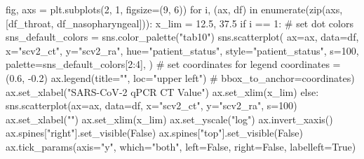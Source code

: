 \documentclass[
  letterpaper,
  DIV=11,
  numbers=noendperiod]{scrartcl}
\newenvironment{Shaded}{\begin{snugshade}}{\end{snugshade}}
\newcommand{\BuiltInTok}[1]{\textcolor[rgb]{0.00,0.23,0.31}{#1}}
\newcommand{\CommentTok}[1]{\textcolor[rgb]{0.37,0.37,0.37}{#1}}
\newcommand{\ControlFlowTok}[1]{\textcolor[rgb]{0.00,0.23,0.31}{#1}}
\newcommand{\DecValTok}[1]{\textcolor[rgb]{0.68,0.00,0.00}{#1}}
\newcommand{\FloatTok}[1]{\textcolor[rgb]{0.68,0.00,0.00}{#1}}
\newcommand{\KeywordTok}[1]{\textcolor[rgb]{0.00,0.23,0.31}{#1}}
\newcommand{\NormalTok}[1]{\textcolor[rgb]{0.00,0.23,0.31}{#1}}
\newcommand{\OperatorTok}[1]{\textcolor[rgb]{0.37,0.37,0.37}{#1}}
\newcommand{\StringTok}[1]{\textcolor[rgb]{0.13,0.47,0.30}{#1}}
\newcommand{\VariableTok}[1]{\textcolor[rgb]{0.07,0.07,0.07}{#1}}
\begin{document}
\begin{Shaded}
\begin{Highlighting}[]
\NormalTok{fig, axs }\OperatorTok{=}\NormalTok{ plt.subplots(}\DecValTok{2}\NormalTok{, }\DecValTok{1}\NormalTok{, figsize}\OperatorTok{=}\NormalTok{(}\DecValTok{9}\NormalTok{, }\DecValTok{6}\NormalTok{))}
\ControlFlowTok{for}\NormalTok{ i, (ax, df) }\KeywordTok{in} \BuiltInTok{enumerate}\NormalTok{(}\BuiltInTok{zip}\NormalTok{(axs, [df\_throat, df\_nasopharyngeal])):}
\NormalTok{    x\_lim }\OperatorTok{=} \FloatTok{12.5}\NormalTok{, }\FloatTok{37.5}
    \ControlFlowTok{if}\NormalTok{ i }\OperatorTok{==} \DecValTok{1}\NormalTok{:}
        \CommentTok{\# set dot colors}
\NormalTok{        sns\_default\_colors }\OperatorTok{=}\NormalTok{ sns.color\_palette(}\StringTok{"tab10"}\NormalTok{)}
\NormalTok{        sns.scatterplot(}
\NormalTok{            ax}\OperatorTok{=}\NormalTok{ax,}
\NormalTok{            data}\OperatorTok{=}\NormalTok{df,}
\NormalTok{            x}\OperatorTok{=}\StringTok{"scv2\_ct"}\NormalTok{,}
\NormalTok{            y}\OperatorTok{=}\StringTok{"scv2\_ra"}\NormalTok{,}
\NormalTok{            hue}\OperatorTok{=}\StringTok{"patient\_status"}\NormalTok{,}
\NormalTok{            style}\OperatorTok{=}\StringTok{"patient\_status"}\NormalTok{,}
\NormalTok{            s}\OperatorTok{=}\DecValTok{100}\NormalTok{,}
\NormalTok{            palette}\OperatorTok{=}\NormalTok{sns\_default\_colors[}\DecValTok{2}\NormalTok{:}\DecValTok{4}\NormalTok{],}
\NormalTok{        )}
        \CommentTok{\# set coordinates for legend}
\NormalTok{        coordinates }\OperatorTok{=}\NormalTok{ (}\FloatTok{0.6}\NormalTok{, }\OperatorTok{{-}}\FloatTok{0.2}\NormalTok{)}
\NormalTok{        ax.legend(title}\OperatorTok{=}\StringTok{""}\NormalTok{, loc}\OperatorTok{=}\StringTok{"upper left"}\NormalTok{)  }\CommentTok{\# bbox\_to\_anchor=coordinates)}
\NormalTok{        ax.set\_xlabel(}\StringTok{"SARS{-}CoV{-}2 qPCR CT Value"}\NormalTok{)}
\NormalTok{        ax.set\_xlim(x\_lim)}
    \ControlFlowTok{else}\NormalTok{:}
\NormalTok{        sns.scatterplot(ax}\OperatorTok{=}\NormalTok{ax, data}\OperatorTok{=}\NormalTok{df, x}\OperatorTok{=}\StringTok{"scv2\_ct"}\NormalTok{, y}\OperatorTok{=}\StringTok{"scv2\_ra"}\NormalTok{, s}\OperatorTok{=}\DecValTok{100}\NormalTok{)}
\NormalTok{        ax.set\_xlabel(}\StringTok{""}\NormalTok{)}
\NormalTok{        ax.set\_xlim(x\_lim)}
\NormalTok{    ax.set\_yscale(}\StringTok{"log"}\NormalTok{)}
\NormalTok{    ax.invert\_xaxis()}
\NormalTok{    ax.spines[}\StringTok{"right"}\NormalTok{].set\_visible(}\VariableTok{False}\NormalTok{)}
\NormalTok{    ax.spines[}\StringTok{"top"}\NormalTok{].set\_visible(}\VariableTok{False}\NormalTok{)}
\NormalTok{    ax.tick\_params(axis}\OperatorTok{=}\StringTok{"y"}\NormalTok{, which}\OperatorTok{=}\StringTok{"both"}\NormalTok{, left}\OperatorTok{=}\VariableTok{False}\NormalTok{, right}\OperatorTok{=}\VariableTok{False}\NormalTok{, labelleft}\OperatorTok{=}\VariableTok{True}\NormalTok{)}

\end{Highlighting}
\end{Shaded}
\end{document}
